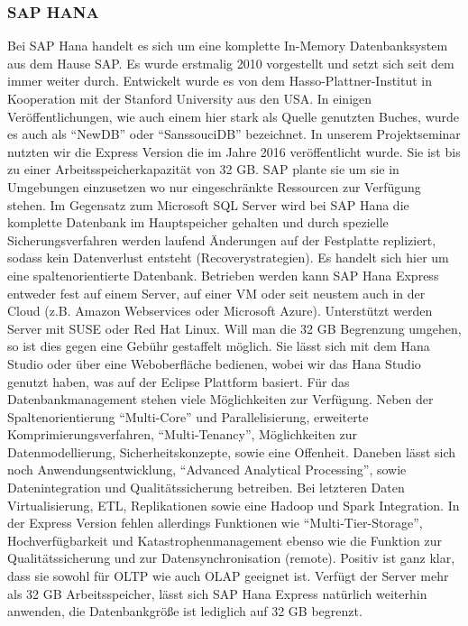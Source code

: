 \documentclass[a4paper, 12pt]{scrartcl}
\begin{document}
\subsubsection{SAP HANA}
Bei SAP Hana handelt es sich um eine komplette In-Memory Datenbanksystem aus dem Hause SAP. Es wurde erstmalig 2010 vorgestellt und setzt sich seit dem immer weiter durch. Entwickelt wurde es von dem Hasso-Plattner-Institut in Kooperation mit der Stanford University aus den USA. In einigen Veröffentlichungen, wie auch einem hier stark als Quelle genutzten Buches, wurde es auch als "`NewDB"' oder "`SanssouciDB"' bezeichnet. In unserem Projektseminar nutzten wir die Express Version die im Jahre 2016 veröffentlicht wurde. Sie ist bis zu einer Arbeitsspeicherkapazität von 32 GB. SAP plante sie um sie in Umgebungen einzusetzen wo nur eingeschränkte Ressourcen zur Verfügung stehen. Im Gegensatz zum Microsoft SQL Server wird bei SAP Hana die komplette Datenbank im Hauptspeicher gehalten und durch spezielle Sicherungsverfahren werden laufend Änderungen auf der Festplatte repliziert, sodass kein Datenverlust entsteht (Recoverystrategien). Es handelt sich hier um eine spaltenorientierte Datenbank. Betrieben werden kann SAP Hana Express entweder fest auf einem Server, auf einer VM oder seit neustem auch in der Cloud (z.B. Amazon Webservices oder Microsoft Azure). Unterstützt werden Server mit SUSE oder Red Hat Linux. Will man die 32 GB Begrenzung umgehen, so ist dies gegen eine Gebühr gestaffelt möglich. Sie lässt sich mit dem Hana Studio oder über eine Weboberfläche bedienen, wobei wir das Hana Studio genutzt haben, was auf der Eclipse Plattform basiert. Für das Datenbankmanagement stehen viele Möglichkeiten zur Verfügung. Neben der Spaltenorientierung "`Multi-Core"' und Parallelisierung, erweiterte Komprimierungsverfahren, "`Multi-Tenancy"', Möglichkeiten zur Datenmodellierung, Sicherheitskonzepte, sowie eine Offenheit. Daneben lässt sich noch  Anwendungsentwicklung, "`Advanced Analytical Processing"', sowie Datenintegration und Qualitätssicherung betreiben. Bei letzteren Daten Virtualisierung, ETL, Replikationen sowie eine Hadoop und Spark Integration. In der Express Version fehlen allerdings Funktionen wie "`Multi-Tier-Storage"', Hochverfügbarkeit und Katastrophenmanagement ebenso wie die Funktion zur Qualitätssicherung und zur Datensynchronisation (remote). Positiv ist ganz klar, dass sie sowohl für OLTP wie auch OLAP geeignet ist. Verfügt der Server mehr als 32 GB Arbeitsspeicher, lässt sich SAP Hana Express natürlich weiterhin anwenden, die Datenbankgröße ist lediglich auf 32 GB begrenzt.   
\end{document}
